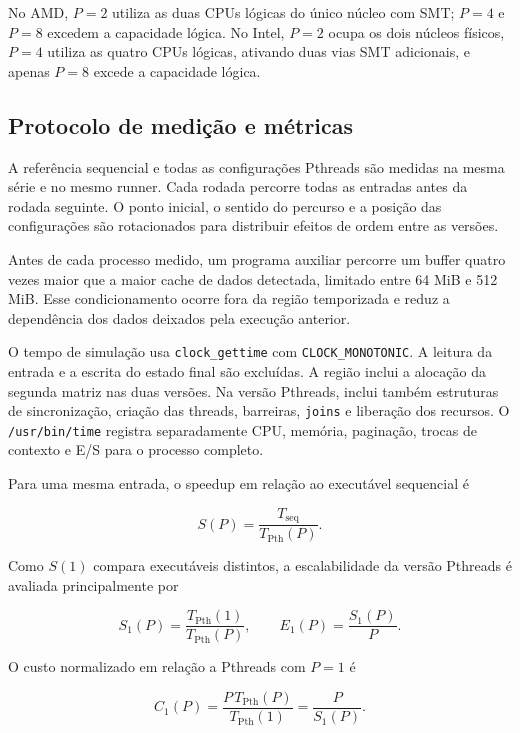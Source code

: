 \documentclass[12pt,a4paper]{article}
\begin{document}
No AMD, $P=2$ utiliza as duas CPUs lógicas do único núcleo com SMT; $P=4$ e
$P=8$ excedem a capacidade lógica. No Intel, $P=2$ ocupa os dois núcleos
físicos, $P=4$ utiliza as quatro CPUs lógicas, ativando duas vias SMT
adicionais, e apenas $P=8$ excede a capacidade lógica.

\subsection{Protocolo de medição e métricas}

A referência sequencial e todas as configurações Pthreads são medidas na mesma
série e no mesmo runner. Cada rodada percorre todas as entradas antes da rodada
seguinte. O ponto inicial, o sentido do percurso e a posição das configurações
são rotacionados para distribuir efeitos de ordem entre as versões.

Antes de cada processo medido, um programa auxiliar percorre um buffer quatro
vezes maior que a maior cache de dados detectada, limitado entre 64 MiB e
512 MiB. Esse condicionamento ocorre fora da região temporizada e reduz a
dependência dos dados deixados pela execução anterior.

O tempo de simulação usa \texttt{clock\_gettime} com
\texttt{CLOCK\_MONOTONIC}. A leitura da entrada e a escrita do estado final são
excluídas. A região inclui a alocação da segunda matriz nas duas versões. Na
versão Pthreads, inclui também estruturas de sincronização, criação das threads,
barreiras, \texttt{joins} e liberação dos recursos. O \texttt{/usr/bin/time}
registra separadamente CPU, memória, paginação, trocas de contexto e E/S para o
processo completo.

Para uma mesma entrada, o speedup em relação ao executável sequencial é

\begin{equation}
    S(P) = \frac{T_{\mathrm{seq}}}{T_{\mathrm{Pth}}(P)}.
\end{equation}

Como $S(1)$ compara executáveis distintos, a escalabilidade da versão Pthreads
é avaliada principalmente por

\begin{equation}
    S_1(P) = \frac{T_{\mathrm{Pth}}(1)}{T_{\mathrm{Pth}}(P)},
    \qquad
    E_1(P) = \frac{S_1(P)}{P}.
\end{equation}

O custo normalizado em relação a Pthreads com $P=1$ é

\begin{equation}
    C_1(P) = \frac{P\,T_{\mathrm{Pth}}(P)}{T_{\mathrm{Pth}}(1)}
           = \frac{P}{S_1(P)}.
\end{equation}
\end{document}
